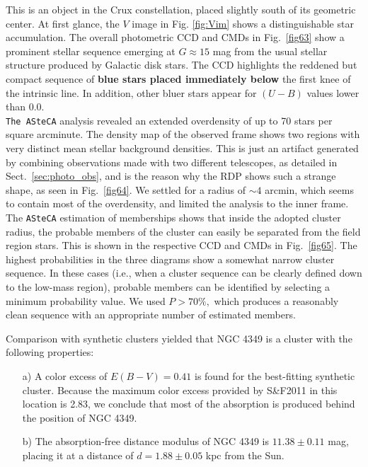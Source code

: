 \documentclass[draft]{aa}
\begin{document}
This is an object in the Crux constellation, placed slightly south of its
geometric center. At first glance, the $V$ image in Fig. \ref{fig:Vim} shows a
distinguishable star accumulation. The overall photometric CCD and CMDs in
Fig.~\ref{fig63} show a prominent stellar sequence emerging at $G\approx15$ mag
from the usual stellar structure produced by Galactic disk stars.
The CCD highlights the reddened but compact sequence of \textbf{blue stars placed
immediately below} the first knee of the intrinsic line. In addition, other
bluer stars appear for $(U-B)$ values lower than 0.0.\\ 

\texttt{The ASteCA} analysis revealed an extended overdensity of up to 70 stars per
square arcminute. The density map of the observed frame shows two regions with
very distinct mean stellar background densities. This is just an artifact
generated by combining observations made with two different telescopes, as
detailed in Sect.~\ref{sec:photo_obs}, and is the reason why
the RDP shows such a strange shape, as seen in Fig.~\ref{fig64}. We
settled for a radius of $\sim4$ arcmin, which seems to contain most of the
overdensity, and limited the analysis to the inner frame.
%
The \texttt{ASteCA} estimation of memberships shows that inside the adopted
cluster radius, the probable members of the cluster can easily be separated
from the field region stars. This is shown in the respective CCD and CMDs in
Fig.~\ref{fig65}. The highest probabilities in the three
diagrams show a somewhat narrow cluster sequence.
In these cases (i.e., when a cluster sequence can be clearly defined
down to the low-mass region), probable members can be identified by  selecting a
minimum probability value. We used $P>70\%,$ which produces a reasonably clean
sequence with an appropriate number of estimated members.

Comparison with synthetic clusters yielded that NGC 4349 is a cluster with the
following properties:

\begin{itemize}
\item [a)] A color excess of $E(B-V)=0.41$ is found for the best-fitting
synthetic cluster. Because the maximum color excess provided by
S\&F2011 in this location is 2.83, we conclude that most of the
absorption is produced behind the position of NGC 4349.
\item [b)] The absorption-free distance modulus of NGC 4349 is
$11.38\pm0.11$ mag, placing it at a distance of $d=1.88\pm0.05$ kpc from
the Sun.
\end{itemize}
\end{document}

